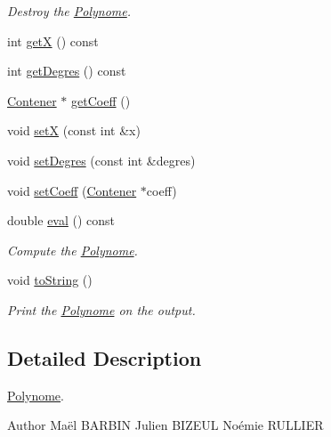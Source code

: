 \begin{DoxyCompactItemize}
\begin{DoxyCompactList}\small\item\em \-Destroy the \hyperlink{class_polynome}{\-Polynome}. \end{DoxyCompactList}\item 
int \hyperlink{class_polynome_a7aa26c3848398b54060f9a56f0a71115}{get\-X} () const 
\item 
int \hyperlink{class_polynome_ae38c5a8d6c1e5d042616e85a53089cea}{get\-Degres} () const 
\item 
\hyperlink{class_contener}{\-Contener} $\ast$ \hyperlink{class_polynome_a097ba5df9216e260c0b18040e605db40}{get\-Coeff} ()
\item 
void \hyperlink{class_polynome_aa4d6009437e84a04987cce5297afd8d1}{set\-X} (const int \&x)
\item 
void \hyperlink{class_polynome_ad20d1d98c1d1da1e264ee56c1a72050c}{set\-Degres} (const int \&degres)
\item 
void \hyperlink{class_polynome_aee44ceb152665f808576e535eddd8267}{set\-Coeff} (\hyperlink{class_contener}{\-Contener} $\ast$coeff)
\item 
double \hyperlink{class_polynome_aef974533b88294be9b8978709a60908c}{eval} () const 
\begin{DoxyCompactList}\small\item\em \-Compute the \hyperlink{class_polynome}{\-Polynome}. \end{DoxyCompactList}\item 
\hypertarget{class_polynome_a07fb8401f8d3774957cc23a364280528}{void \hyperlink{class_polynome_a07fb8401f8d3774957cc23a364280528}{to\-String} ()}\label{class_polynome_a07fb8401f8d3774957cc23a364280528}

\begin{DoxyCompactList}\small\item\em \-Print the \hyperlink{class_polynome}{\-Polynome} on the output. \end{DoxyCompactList}\end{DoxyCompactItemize}


\subsection{\-Detailed \-Description}
\hyperlink{class_polynome}{\-Polynome}. 

\begin{DoxyAuthor}{\-Author}
\-Maël \-B\-A\-R\-B\-I\-N \-Julien \-B\-I\-Z\-E\-U\-L \-Noémie \-R\-U\-L\-L\-I\-E\-R 
\end{DoxyAuthor}


